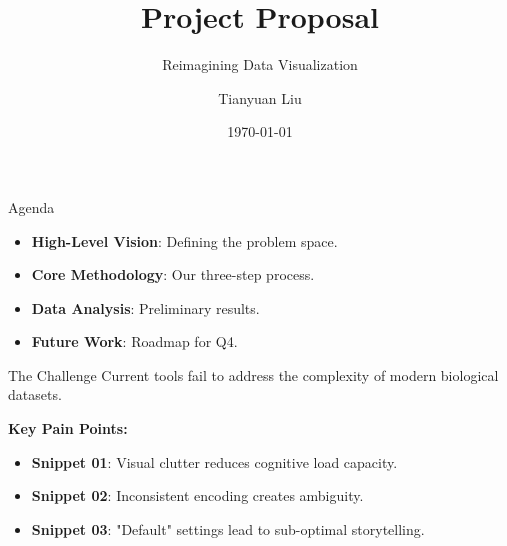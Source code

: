 \documentclass[aspectratio=169, 10pt, t]{beamer}
\title{Project Proposal}
\subtitle{Reimagining Data Visualization}
\author{Tianyuan Liu}
\date{\today}
\begin{document}
\begin{frame}[plain]
    \titlepage
\end{frame}

\begin{frame}{Agenda}
    \vspace{0.5cm}
    \begin{itemize}
        \item \textbf{High-Level Vision}: Defining the problem space.
        \item \textbf{Core Methodology}: Our three-step process.
        \item \textbf{Data Analysis}: Preliminary results.
        \item \textbf{Future Work}: Roadmap for Q4.
    \end{itemize}
\end{frame}

\begin{frame}{The Challenge}
    \vspace{0.5cm}
    Current tools fail to address the complexity of modern biological datasets.
    
    \vspace{1cm}
    \textbf{Key Pain Points:}
    \vspace{0.5em}
    \begin{itemize}
        \item \textbf{Snippet 01}: Visual clutter reduces cognitive load capacity.
        \item \textbf{Snippet 02}: Inconsistent encoding creates ambiguity.
        \item \textbf{Snippet 03}: "Default" settings lead to sub-optimal storytelling.
    \end{itemize}
\end{frame}
\end{document}
